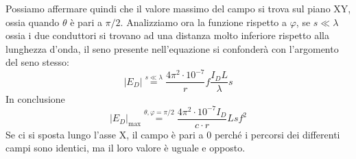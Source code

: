 Possiamo affermare quindi che il valore massimo del campo si trova sul piano XY, ossia quando
$\theta$ è pari a $\pi/2$.
Analizziamo ora la funzione rispetto a $\varphi$, se $s\ll\lambda$ ossia i due conduttori
si trovano ad una distanza molto inferiore rispetto alla lunghezza d'onda, il seno presente nell'equazione
si confonderà con l'argomento del seno stesso:
$$
\left|E_D\right| \stackrel{s\ll\lambda}{=} \frac{4\pi^2\cdot10^{-7}}{r}f\frac{I_D L}{\lambda}s  
$$
In conclusione
$$
\left|E_D \right|_{\text{max}} \stackrel{\theta,\varphi = \pi/2}{=} \frac{4\pi^2\cdot10^{-7}I_D}{c\cdot r}Lsf^2
$$
Se ci si sposta lungo l'asse X, il campo è pari a 0 perché i percorsi dei differenti campi sono identici,
ma il loro valore è uguale e opposto.

